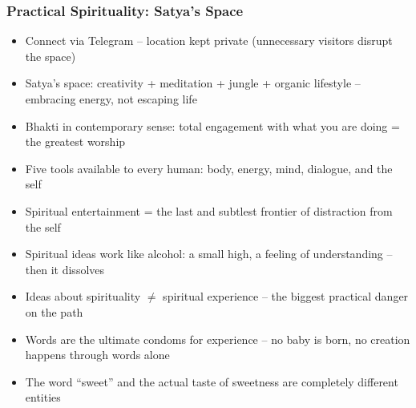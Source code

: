\begin{frame}[fragile]\frametitle{Practical Spirituality: Satya's Space}
  \begin{itemize}
    \item Connect via Telegram -- location kept private (unnecessary visitors disrupt the space)
    \item Satya's space: creativity + meditation + jungle + organic lifestyle -- embracing energy, not escaping life
    \item Bhakti in contemporary sense: total engagement with what you are doing = the greatest worship
    \item Five tools available to every human: body, energy, mind, dialogue, and the self
    \item Spiritual entertainment = the last and subtlest frontier of distraction from the self
    \item Spiritual ideas work like alcohol: a small high, a feeling of understanding -- then it dissolves
    \item Ideas about spirituality $\neq$ spiritual experience -- the biggest practical danger on the path
    \item Words are the ultimate condoms for experience -- no baby is born, no creation happens through words alone
    \item The word ``sweet'' and the actual taste of sweetness are completely different entities
  \end{itemize}
\end{frame}

